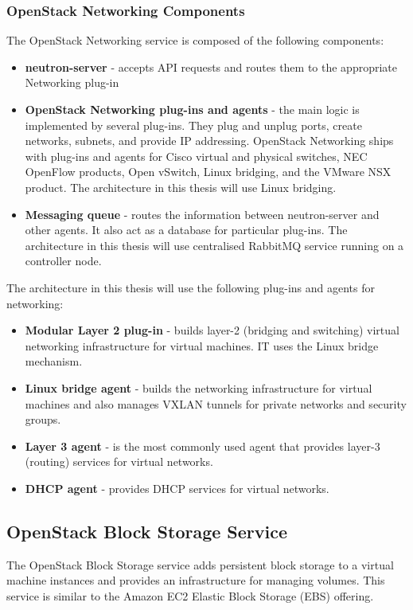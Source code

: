 \subsubsection*{OpenStack Networking Components}
The OpenStack Networking service is composed of the following components:
\begin{itemize}
  \item{\textbf{neutron-server} - accepts API requests and routes them to the appropriate Networking plug-in}
  \item{\textbf{OpenStack Networking plug-ins and agents} - the main logic is implemented by several plug-ins. They plug and unplug ports, create networks, subnets, and provide IP addressing. OpenStack Networking ships with plug-ins and agents for Cisco virtual and physical switches, NEC OpenFlow products, Open vSwitch, Linux bridging, and the VMware NSX product. The architecture in this thesis will use Linux bridging.}
  \item{\textbf{Messaging queue} - routes the information between neutron-server and other agents. It also act as a database for particular plug-ins. The architecture in this thesis will use centralised RabbitMQ service running on a controller node.}
  \\\cite{InstallGuide}
\end{itemize}

The architecture in this thesis will use the following plug-ins and agents for networking:
\begin{itemize}
  \item{\textbf{Modular Layer 2 plug-in} - builds layer-2 (bridging and switching) virtual networking infrastructure for virtual machines. IT uses the Linux bridge mechanism.}
  \item{\textbf{Linux bridge agent} - builds the networking infrastructure for virtual machines and also manages VXLAN tunnels for private networks and security groups.}
  \item{\textbf{Layer 3 agent} - is the most commonly used agent that provides layer-3 (routing) services for virtual networks.}
  \item{\textbf{DHCP agent} - provides DHCP services for virtual networks.}
\end{itemize}







\subsection{OpenStack Block Storage Service}
The OpenStack Block Storage service adds persistent block storage to a virtual machine instances and provides an infrastructure for managing volumes. This service is similar to the Amazon EC2 Elastic Block Storage (EBS) offering.

